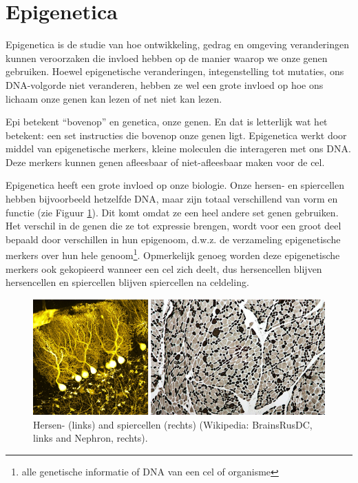 \documentclass[
  11pt,
]{book}
\begin{document}
\hypertarget{epigenetica}{%
\section{Epigenetica}\label{epigenetica}}

Epigenetica is de studie van hoe ontwikkeling, gedrag en omgeving veranderingen kunnen veroorzaken die invloed hebben op de manier waarop we onze genen gebruiken. Hoewel epigenetische veranderingen, integenstelling tot mutaties, ons DNA-volgorde niet veranderen, hebben ze wel een grote invloed op hoe ons lichaam onze genen kan lezen of net niet kan lezen.

Epi betekent ``bovenop'' en genetica, onze genen. En dat is letterlijk wat het betekent: een set instructies die bovenop onze genen ligt. Epigenetica werkt door middel van epigenetische merkers, kleine moleculen die interageren met ons DNA. Deze merkers kunnen genen afleesbaar of niet-afleesbaar maken voor de cel.

Epigenetica heeft een grote invloed op onze biologie. Onze hersen- en spiercellen hebben bijvoorbeeld hetzelfde DNA, maar zijn totaal verschillend van vorm en functie (zie Figuur \ref{fig:brainMuscle}). Dit komt omdat ze een heel andere set genen gebruiken. Het verschil in de genen die ze tot expressie brengen, wordt voor een groot deel bepaald door verschillen in hun epigenoom, d.w.z. de verzameling epigenetische merkers over hun hele genoom\footnote{alle genetische informatie of DNA van een cel of organisme}. Opmerkelijk genoeg worden deze epigenetische merkers ook gekopieerd wanneer een cel zich deelt, dus hersencellen blijven hersencellen en spiercellen blijven spiercellen na celdeling.

\begin{figure}

{\centering \includegraphics[width=0.9\linewidth]{./figs/brainMuscleCells} 

}

\caption{Hersen- (links) and spiercellen (rechts) (Wikipedia: BrainsRusDC, links and Nephron, rechts).}\label{fig:brainMuscle}
\end{figure}
\end{document}
